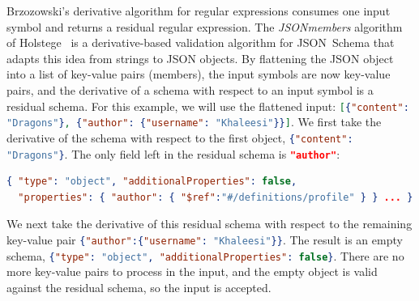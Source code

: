 \documentclass[runningheads]{llncs}
\newcommand{\JSONSchema}{%
  JSON~Schema\xspace%
}
\newcommand{\JSON}{\ac{JSON}\xspace}
\begin{document}
Brzozowski's derivative algorithm for regular expressions consumes one input symbol and returns a residual regular expression.
The \emph{JSONmembers} algorithm of Holstege~\cite{holstege2019application} is a derivative-based validation algorithm for \JSONSchema that adapts this idea from strings to \JSON objects.
By flattening the \JSON object into a list of key-value pairs (members),
the input symbols are now key-value pairs, and the derivative of a schema with respect to an input symbol is a residual schema.
For this example, we will use the flattened input: \lstinline[language=json]|[{"content": "Dragons"}, {"author": {"username": "Khaleesi"}}]|.
We first take the derivative of the schema with respect to the first object, \lstinline[language=json]|{"content": "Dragons"}|. 
The only field left in the residual schema is \lstinline[language=json]|"author"|:
\begin{lstlisting}[language=json]
{ "type": "object", "additionalProperties": false, 
  "properties": { "author": { "$ref":"#/definitions/profile" } } ... }
\end{lstlisting}
We next take the derivative of this residual schema with respect to the remaining key-value pair \lstinline[language=json]|{"author":{"username": "Khaleesi"}}|. 
The result is an empty schema, \lstinline[language=json]
|{"type": "object", "additionalProperties": false}|.
There are no more key-value pairs to process in the input, and the empty object is valid against the residual schema, so the input is accepted.
\end{document}
